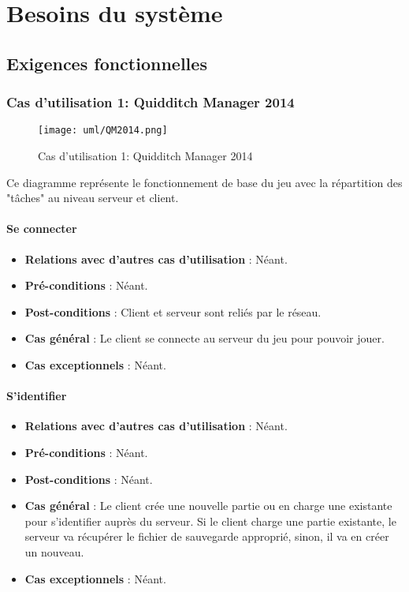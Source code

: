 \documentclass[a4paper,titlepage]{scrreprt}
\begin{document}
\chapter{Besoins du système}
\section{Exigences fonctionnelles}
 \subsection{Cas d'utilisation 1: Quidditch Manager 2014}
  \begin{figure}[H]
    \center
    \texttt{[image: uml/QM2014.png]}
    \caption{Cas d'utilisation 1: Quidditch Manager 2014}
  \end{figure}	
    Ce diagramme représente le fonctionnement de base du jeu avec la répartition des "tâches" au niveau serveur et client.
    \subsubsection{Se connecter}
      \begin{itemize}
        \item \textbf{Relations avec d'autres cas d'utilisation}  : Néant.
        \item \textbf{Pré-conditions} : Néant.
        \item \textbf{Post-conditions} : Client et serveur sont reliés par le réseau.
        \item \textbf{Cas général} : Le client se connecte au serveur du jeu pour pouvoir jouer. 
        \item \textbf{Cas exceptionnels} : Néant.
      \end{itemize}
    \subsubsection{S'identifier}
      \begin{itemize}
        \item \textbf{Relations avec d'autres cas d'utilisation}  : Néant.
        \item \textbf{Pré-conditions} : Néant.
        \item \textbf{Post-conditions} : Néant.
        \item \textbf{Cas général} : Le client crée une nouvelle \gls{partie} ou en charge une existante pour s’identifier auprès du serveur. Si le client charge une partie existante, le serveur va récupérer le fichier de sauvegarde approprié, sinon, il va en créer un nouveau.
        \item \textbf{Cas exceptionnels} : Néant.
      \end{itemize}
\end{document}
